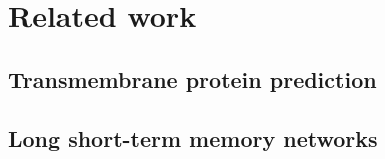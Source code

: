 \section{Related work}
\subsection{Transmembrane protein prediction}
% 
%

\subsection{Long short-term memory networks}
